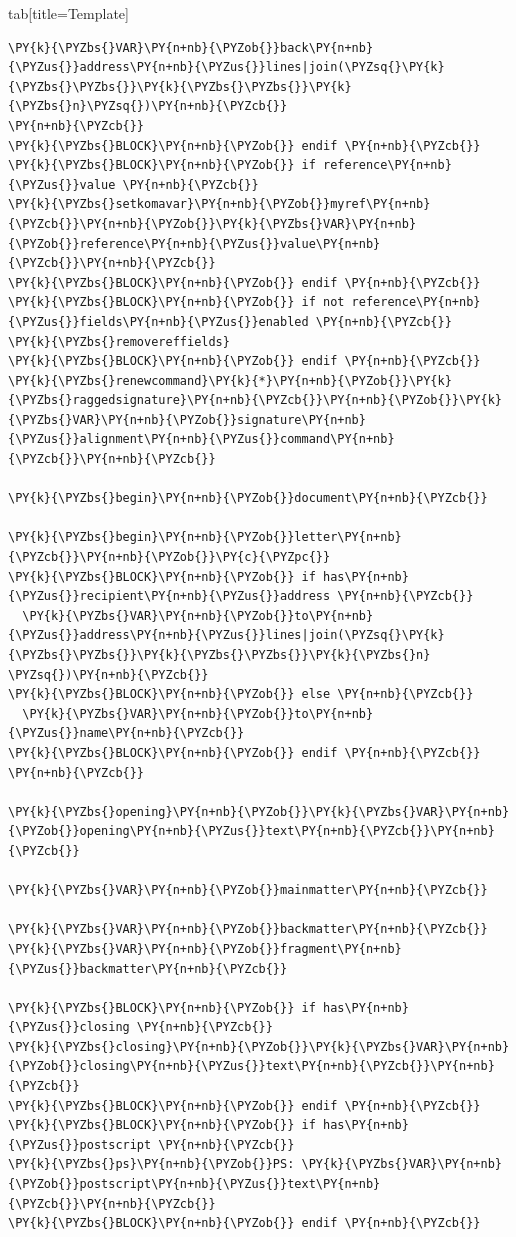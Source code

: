 \documentclass[a4paper,twoside]{article}
\begin{document}
\begin{tsdiv}{tab}[title=Template]
\begin{tscode}[lang=latex, engine=pygments]
\begin{Verbatim}[commandchars=\\\{\},breaklines, breakanywhere, commandchars=\\\{\}]
  \PY{k}{\PYZbs{}VAR}\PY{n+nb}{\PYZob{}}back\PY{n+nb}{\PYZus{}}address\PY{n+nb}{\PYZus{}}lines|join(\PYZsq{}\PY{k}{\PYZbs{}\PYZbs{}}\PY{k}{\PYZbs{}\PYZbs{}}\PY{k}{\PYZbs{}n}\PYZsq{})\PY{n+nb}{\PYZcb{}}
\PY{n+nb}{\PYZcb{}}
\PY{k}{\PYZbs{}BLOCK}\PY{n+nb}{\PYZob{}} endif \PY{n+nb}{\PYZcb{}}
\PY{k}{\PYZbs{}BLOCK}\PY{n+nb}{\PYZob{}} if reference\PY{n+nb}{\PYZus{}}value \PY{n+nb}{\PYZcb{}}
\PY{k}{\PYZbs{}setkomavar}\PY{n+nb}{\PYZob{}}myref\PY{n+nb}{\PYZcb{}}\PY{n+nb}{\PYZob{}}\PY{k}{\PYZbs{}VAR}\PY{n+nb}{\PYZob{}}reference\PY{n+nb}{\PYZus{}}value\PY{n+nb}{\PYZcb{}}\PY{n+nb}{\PYZcb{}}
\PY{k}{\PYZbs{}BLOCK}\PY{n+nb}{\PYZob{}} endif \PY{n+nb}{\PYZcb{}}
\PY{k}{\PYZbs{}BLOCK}\PY{n+nb}{\PYZob{}} if not reference\PY{n+nb}{\PYZus{}}fields\PY{n+nb}{\PYZus{}}enabled \PY{n+nb}{\PYZcb{}}
\PY{k}{\PYZbs{}removereffields}
\PY{k}{\PYZbs{}BLOCK}\PY{n+nb}{\PYZob{}} endif \PY{n+nb}{\PYZcb{}}
\PY{k}{\PYZbs{}renewcommand}\PY{k}{*}\PY{n+nb}{\PYZob{}}\PY{k}{\PYZbs{}raggedsignature}\PY{n+nb}{\PYZcb{}}\PY{n+nb}{\PYZob{}}\PY{k}{\PYZbs{}VAR}\PY{n+nb}{\PYZob{}}signature\PY{n+nb}{\PYZus{}}alignment\PY{n+nb}{\PYZus{}}command\PY{n+nb}{\PYZcb{}}\PY{n+nb}{\PYZcb{}}

\PY{k}{\PYZbs{}begin}\PY{n+nb}{\PYZob{}}document\PY{n+nb}{\PYZcb{}}

\PY{k}{\PYZbs{}begin}\PY{n+nb}{\PYZob{}}letter\PY{n+nb}{\PYZcb{}}\PY{n+nb}{\PYZob{}}\PY{c}{\PYZpc{}}
\PY{k}{\PYZbs{}BLOCK}\PY{n+nb}{\PYZob{}} if has\PY{n+nb}{\PYZus{}}recipient\PY{n+nb}{\PYZus{}}address \PY{n+nb}{\PYZcb{}}
  \PY{k}{\PYZbs{}VAR}\PY{n+nb}{\PYZob{}}to\PY{n+nb}{\PYZus{}}address\PY{n+nb}{\PYZus{}}lines|join(\PYZsq{}\PY{k}{\PYZbs{}\PYZbs{}}\PY{k}{\PYZbs{}\PYZbs{}}\PY{k}{\PYZbs{}n}  \PYZsq{})\PY{n+nb}{\PYZcb{}}
\PY{k}{\PYZbs{}BLOCK}\PY{n+nb}{\PYZob{}} else \PY{n+nb}{\PYZcb{}}
  \PY{k}{\PYZbs{}VAR}\PY{n+nb}{\PYZob{}}to\PY{n+nb}{\PYZus{}}name\PY{n+nb}{\PYZcb{}}
\PY{k}{\PYZbs{}BLOCK}\PY{n+nb}{\PYZob{}} endif \PY{n+nb}{\PYZcb{}}
\PY{n+nb}{\PYZcb{}}

\PY{k}{\PYZbs{}opening}\PY{n+nb}{\PYZob{}}\PY{k}{\PYZbs{}VAR}\PY{n+nb}{\PYZob{}}opening\PY{n+nb}{\PYZus{}}text\PY{n+nb}{\PYZcb{}}\PY{n+nb}{\PYZcb{}}

\PY{k}{\PYZbs{}VAR}\PY{n+nb}{\PYZob{}}mainmatter\PY{n+nb}{\PYZcb{}}

\PY{k}{\PYZbs{}VAR}\PY{n+nb}{\PYZob{}}backmatter\PY{n+nb}{\PYZcb{}}
\PY{k}{\PYZbs{}VAR}\PY{n+nb}{\PYZob{}}fragment\PY{n+nb}{\PYZus{}}backmatter\PY{n+nb}{\PYZcb{}}

\PY{k}{\PYZbs{}BLOCK}\PY{n+nb}{\PYZob{}} if has\PY{n+nb}{\PYZus{}}closing \PY{n+nb}{\PYZcb{}}
\PY{k}{\PYZbs{}closing}\PY{n+nb}{\PYZob{}}\PY{k}{\PYZbs{}VAR}\PY{n+nb}{\PYZob{}}closing\PY{n+nb}{\PYZus{}}text\PY{n+nb}{\PYZcb{}}\PY{n+nb}{\PYZcb{}}
\PY{k}{\PYZbs{}BLOCK}\PY{n+nb}{\PYZob{}} endif \PY{n+nb}{\PYZcb{}}
\PY{k}{\PYZbs{}BLOCK}\PY{n+nb}{\PYZob{}} if has\PY{n+nb}{\PYZus{}}postscript \PY{n+nb}{\PYZcb{}}
\PY{k}{\PYZbs{}ps}\PY{n+nb}{\PYZob{}}PS: \PY{k}{\PYZbs{}VAR}\PY{n+nb}{\PYZob{}}postscript\PY{n+nb}{\PYZus{}}text\PY{n+nb}{\PYZcb{}}\PY{n+nb}{\PYZcb{}}
\PY{k}{\PYZbs{}BLOCK}\PY{n+nb}{\PYZob{}} endif \PY{n+nb}{\PYZcb{}}


\end{Verbatim}
\end{tscode}
\end{tsdiv}
\end{document}
